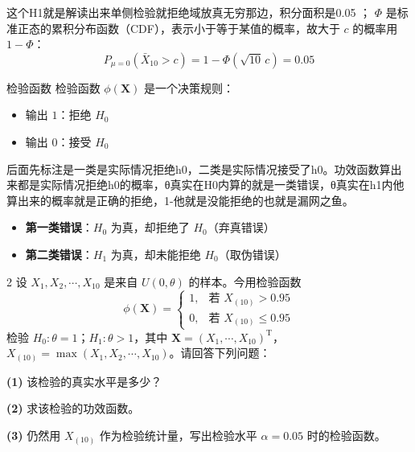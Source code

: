 \begin{dxtips}
   这个H1就是解读出来单侧检验就拒绝域放真无穷那边，积分面积是0.05
   ；  $\Phi$ 是标准正态的累积分布函数（CDF），表示小于等于某值的概率，故大于 $c$ 的概率用 $1-\Phi$：
\[
P_{\mu=0}(\bar{X}_{10} > c) = 1 - \Phi(\sqrt{10}\,c) = 0.05
\]
\end{dxtips}

\begin{definition}{检验函数}{}
检验函数 $\phi(\boldsymbol{X})$ 是一个决策规则：
\begin{itemize}
    \item 输出 $1$：拒绝 $H_0$
    \item 输出 $0$：接受 $H_0$
\end{itemize}
\end{definition}
\begin{dxtips}
    后面先标注是一类是实际情况拒绝h0，二类是实际情况接受了h0。功效函数算出来都是实际情况拒绝h0的概率，θ真实在H0内算的就是一类错误，θ真实在h1内他算出来的概率就是正确的拒绝，1-他就是没能拒绝的也就是漏网之鱼。
    \begin{itemize}
    \item \textbf{第一类错误}：$H_0$ 为真，却拒绝了 $H_0$（弃真错误）
    \item \textbf{第二类错误}：$H_1$ 为真，却未能拒绝 $H_0$（取伪错误）
\end{itemize}
\end{dxtips}
\begin{homework}{2}
设 $X_1, X_2, \cdots, X_{10}$ 是来自 $U(0, \theta)$ 的样本。今用检验函数
$$\phi(\boldsymbol{X}) = \begin{cases} 1, & \text{若 } X_{(10)} > 0.95 \\ 0, & \text{若 } X_{(10)} \leq 0.95 \end{cases}$$
检验 $H_0: \theta = 1$；$H_1: \theta > 1$，其中 $\boldsymbol{X} = (X_1, \cdots, X_{10})^\mathrm{T}$，$X_{(10)} = \max(X_1, X_2, \cdots, X_{10})$。请回答下列问题：

\textbf{(1)} 该检验的真实水平是多少？

\textbf{(2)} 求该检验的功效函数。

\textbf{(3)} 仍然用 $X_{(10)}$ 作为检验统计量，写出检验水平 $\alpha = 0.05$ 时的检验函数。
\end{homework}
